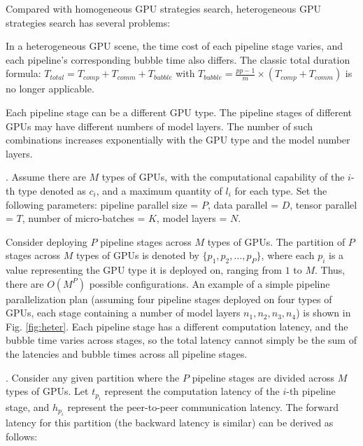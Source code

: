 Compared with homogeneous GPU strategies search, heterogeneous GPU strategies search has several problems:
\begin{enumerate}[label={[\arabic*]}, itemsep=0pt, leftmargin=*,topsep=0pt]
    \item In a heterogeneous GPU scene, the time cost of each pipeline stage varies, and each pipeline's corresponding bubble time also differs. The classic total duration formula: 
    $
    T_{total} = T_{comp} + T_{comm} + T_{bubble}
    $
    with
    $
    T_{bubble}=\frac{pp - 1}{m} \times (T_{comp}+T_{comm})
    $
    is no longer applicable.%
    \item Each pipeline stage can be a different GPU type. The pipeline stages of different GPUs may have different numbers of model layers. The number of such combinations increases exponentially with the GPU type and the model number layers. %
\end{enumerate}

. Assume there are $M$ types of GPUs, with the computational capability of the $i$-th type denoted as $c_i$, and a maximum quantity of $l_i$ for each type. Set the following parameters: pipeline parallel size = $P$, data parallel = $D$, tensor parallel = $T$, number of micro-batches = $K$, model layers = $N$.

Consider deploying $P$ pipeline stages across $M$ types of GPUs. The partition of $P$ stages across $M$ types of GPUs is denoted by $\{p_1, p_2, \dots, p_P\}$, where each $p_i$ is a value representing the GPU type it is deployed on, ranging from $1$ to $M$. Thus, there are $O(M^P)$ possible configurations. An example of a simple pipeline parallelization plan (assuming four pipeline stages deployed on four types of GPUs, each stage containing a number of model layers $n_1, n_2, n_3, n_4$) is shown in Fig. \ref{fig:heter}. Each pipeline stage has a different computation latency, and the bubble time varies across stages, so the total latency cannot simply be the sum of the latencies and bubble times across all pipeline stages. 

. Consider any given partition where the $P$ pipeline stages are divided across $M$ types of GPUs. Let $t_{p_i}$ represent the computation latency of the $i$-th pipeline stage, and $h_{p_i}$ represent the peer-to-peer communication latency. The forward latency for this partition (the backward latency is similar) can be derived as follows:


